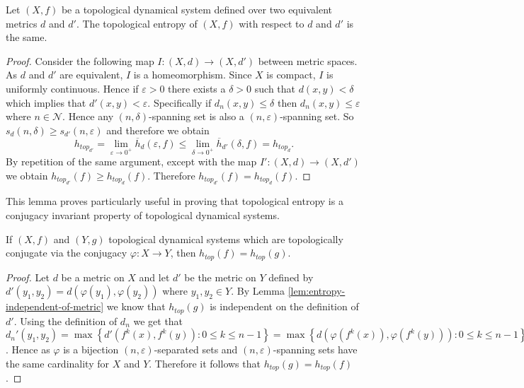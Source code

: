 \begin{lem} \label{lem:entropy-independent-of-metric}
    Let $(X, f)$ be a topological dynamical system defined over two equivalent metrics $d$ and $d'$. The topological entropy of $(X, f)$ with respect to $d$ and $d'$ is the same.
    \begin{proof}
        Consider the following map  $I: (X, d) \to (X, d')$ between metric spaces. As $d$ and $d'$ are equivalent, $I$ is a homeomorphism. Since $X$ is compact, $I$ is uniformly continuous. Hence if $\varepsilon > 0$ there exists a $\delta > 0$ such that $d(x, y) < \delta$ which implies that $d'(x, y) < \varepsilon$. Specifically if $d_n(x, y) \leq \delta$ then $d_n(x, y) \leq \varepsilon$ where $n \in \mathcal{N}$. Hence any $(n, \delta)$-spanning set is also a $(n, \varepsilon)$-spanning set. So $s_d(n, \delta) \geq s_{d'}(n, \varepsilon)$ and therefore we obtain  \[h_{top_{d'}} = \lim_{\varepsilon \to 0^+}{\overline{h}_d(\varepsilon, f)} \leq \lim_{\delta \to 0^+}{\overline{h}_{d'}(\delta, f)} = h_{top_d}.\] By repetition of the same argument, except with the map $I': (X, d) \to (X, d')$ we obtain $h_{top_{d'}}(f) \geq h_{top_d}(f)$. Therefore $h_{top_{d'}}(f) = h_{top_d}(f)$.
    \end{proof}
\end{lem}

This lemma proves particularly useful in proving that topological entropy is a conjugacy invariant property of topological dynamical systems.

\begin{prop} \label{prop:conjugacy-preserves-entropy}
    If $(X, f)$ and $(Y, g)$ topological dynamical systems which are topologically conjugate via the conjugacy $\varphi: X \to Y$, then $h_{top}(f) = h_{top}(g)$.
    \begin{proof}
    Let $d$ be a metric on $X$ and let $d'$ be the metric on $Y$ defined by $d'(y_1, y_2) = d(\varphi(y_1), \varphi(y_2))$ where $y_1, y_2 \in Y$. By Lemma \ref{lem:entropy-independent-of-metric} we know that $h_{top}(g)$ is independent on the definition of $d'$. Using the definition of $d_n$ we get that $d_n'(y_1, y_2) = \max{\left\lbrace d'(f^k(x), f^k(y)): 0 \leq k \leq n - 1 \right\rbrace} = \max{\left\lbrace d(\varphi(f^k(x)), \varphi(f^k(y))): 0 \leq k \leq n - 1 \right\rbrace} = \max{\left\lbrace d(f^k(\varphi(x)), f^k(\varphi(y))): 0 \leq k \leq n - 1 \right\rbrace}  = d_n(\varphi(y_1), \varphi(y_2))$. Hence as $\varphi$ is a bijection $(n, \varepsilon)$-separated sets and $(n, \varepsilon)$-spanning sets have the same cardinality for $X$ and $Y$. Therefore it follows that $h_{top}(g) = h_{top}(f)$.
    \end{proof}
\end{prop}

